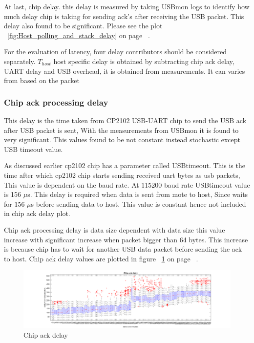 At last, chip delay. this delay is measured by taking USBmon logs to identify how much delay chip is taking for sending ack's after receiving the USB packet. This delay also found to be significant. Please see the plot ~\ref{fig:Host_polling_and_stack_delay} on page ~\pageref{fig:Host_polling_and_stack_delay}.


For the evaluation of latency, four delay contributors should be considered separately. $T_{host}$ host specific delay is obtained by subtracting chip ack delay, UART delay and USB overhead, it is obtained from measurements.
It can varies from based on the packet%


\subsubsection{Chip ack processing delay}
This delay is the time taken from CP2102 USB-UART chip to send the USB ack after USB packet is sent, With the measurements from USBmon it is found to very significant. This values found to be not constant instead stochastic except USB timeout value.

As discussed earlier cp2102 chip has a parameter called USBtimeout. This is the time after which cp2102 chip starts sending received uart bytes as usb packets, This value is dependent on the baud rate.
At 115200 baud rate USBtimeout value is 156 $\mu$s. This delay is required when data is sent from mote to host, Since waits for 156 $\mu$s before sending data to host. This value is constant hence not included in chip ack delay plot.

Chip ack processing delay is data size dependent with data size this value increase with significant increase when packet bigger than 64 bytes. This increase is because chip has to wait for another USB data packet before sending the ack to host. Chip ack delay values are plotted in figure ~\ref{fig:Chip_ack_delay} on page ~\pageref{fig:Chip_ack_delay}.


\begin{figure}[H]
	\includegraphics[width=1.4\textwidth,center]{untitled.png}
	\caption{Chip ack delay}
	\label{fig:Chip_ack_delay}
\end{figure}

